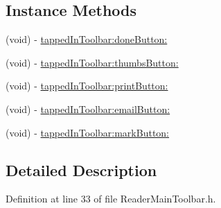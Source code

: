 \subsection*{Instance Methods}
\begin{DoxyCompactItemize}
\item 
(void) -\/ \hyperlink{protocol_reader_main_toolbar_delegate-p_ac6e6634e74e67393ce7d855bcb0ef503}{tapped\-In\-Toolbar\-:done\-Button\-:}
\item 
(void) -\/ \hyperlink{protocol_reader_main_toolbar_delegate-p_aadd3af1a2dd465ca3dce248572fee3a3}{tapped\-In\-Toolbar\-:thumbs\-Button\-:}
\item 
(void) -\/ \hyperlink{protocol_reader_main_toolbar_delegate-p_a385d12621b90bff7ea6320656aa20e37}{tapped\-In\-Toolbar\-:print\-Button\-:}
\item 
(void) -\/ \hyperlink{protocol_reader_main_toolbar_delegate-p_aa89d3fbf056cd9a35d08d5f2f3d7c704}{tapped\-In\-Toolbar\-:email\-Button\-:}
\item 
(void) -\/ \hyperlink{protocol_reader_main_toolbar_delegate-p_ad5091069cb05ce63825ffdcef02e93a7}{tapped\-In\-Toolbar\-:mark\-Button\-:}
\end{DoxyCompactItemize}


\subsection{Detailed Description}


Definition at line 33 of file Reader\-Main\-Toolbar.\-h.



